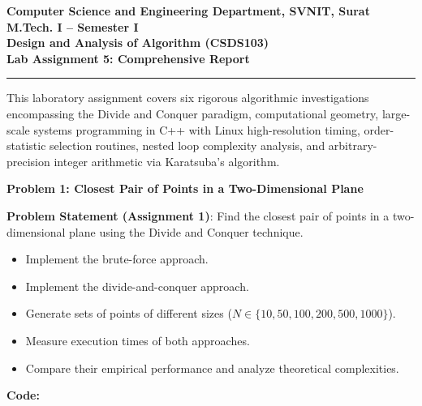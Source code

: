 \documentclass[12pt]{article}
\begin{document}
\begin{center}
\textbf{Computer Science and Engineering Department, SVNIT, Surat}\\
\textbf{M.Tech. I -- Semester I}\\
\textbf{Design and Analysis of Algorithm (CSDS103)}\\
\textbf{Lab Assignment 5: Comprehensive Report}
\end{center}

\vspace{0.3cm}
\hrule
\vspace{0.4cm}

This laboratory assignment covers six rigorous algorithmic investigations encompassing the Divide and Conquer paradigm, computational geometry, large-scale systems programming in C++ with Linux high-resolution timing, order-statistic selection routines, nested loop complexity analysis, and arbitrary-precision integer arithmetic via Karatsuba's algorithm.

\vspace{0.4cm}

\begin{center}
\textbf{Problem 1: Closest Pair of Points in a Two-Dimensional Plane}
\end{center}

\textbf{Problem Statement (Assignment 1)}:
Find the closest pair of points in a two-dimensional plane using the Divide and Conquer technique.
\begin{itemize}
    \item Implement the brute-force approach.
    \item Implement the divide-and-conquer approach.
    \item Generate sets of points of different sizes ($N \in \{10, 50, 100, 200, 500, 1000\}$).
    \item Measure execution times of both approaches.
    \item Compare their empirical performance and analyze theoretical complexities.
\end{itemize}

\vspace{0.2cm}
\textbf{Code:}
\end{document}
